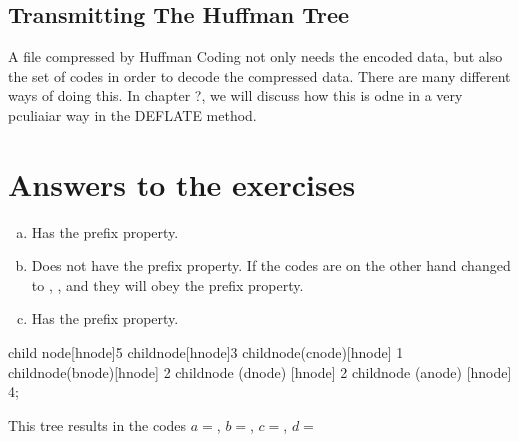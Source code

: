 \subsection{Transmitting The Huffman Tree}

A file compressed by Huffman Coding not only needs the encoded data,
but also the set of codes in order to decode the compressed
data. There are many different ways of doing this. In chapter ?, we
will discuss how this is odne in a very pculiaiar way in the DEFLATE method.

\section{Answers to the exercises}

\begin{Answer}[ref={prefix-prop}]

  \begin{enumerate}[(a)]
  \item Has the prefix property.
  \item Does not have the prefix property. If the codes are on the
    other hand changed to , ,  and 
    they will obey the prefix property.
  \item Has the prefix property.

  \end{enumerate}

\end{Answer}

\begin{Answer}[ref={nuther}]
  \begin{huffmanc}

    child {node[hnode]{5}
      child{node[hnode]{3}
        child{node(cnode)[hnode] {1}}
        child{node(bnode)[hnode] {2}}}
      child{node (dnode) [hnode] {2}}}
    child{node (anode) [hnode] {4}};


  \end{huffmanc}

  This tree results in the codes $a=$, $b=$,
  $c=$, $d=$

\end{Answer}
